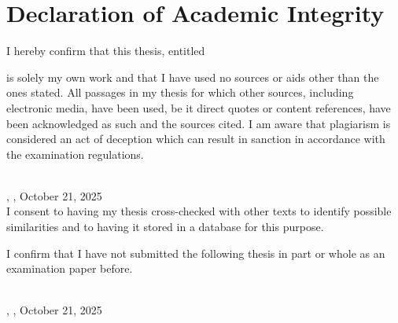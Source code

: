 \chapter*{Declaration of Academic Integrity}

I hereby confirm that this thesis, entitled 

\begin{center}
\textit{\printtitle}
\end{center}

 is solely my own work and that I have used no sources or aids other than the ones stated. All passages in my thesis for which other sources, including electronic media, have been used, be it direct quotes or content references, have been acknowledged as such and the sources cited. I am aware that plagiarism is considered an act of deception which can result in sanction in accordance with the examination regulations.


\vspace{0.75cm}
\parbox{17em}{\hrulefill} \\
\printname, \printcity, October 21, 2025 \\




I consent to having my thesis cross-checked with other texts to identify possible similarities and to having it stored in a database for this purpose.

I confirm that I have not submitted the following thesis in part or whole as an examination paper before.

\vspace{0.75cm}
\parbox{17em}{\hrulefill} \\
\printname, \printcity, October 21, 2025 \\

